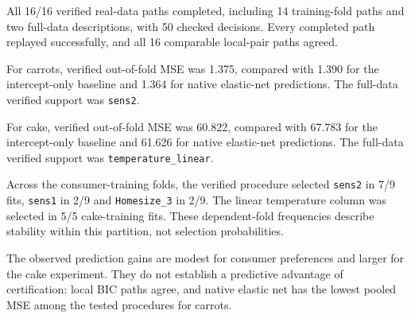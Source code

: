All 16/16 verified real-data paths completed, including 14 training-fold
paths and two full-data descriptions, with 50 checked decisions. Every completed
path replayed successfully, and all 16 comparable local-pair paths agreed.

For carrots, verified out-of-fold MSE was 1.375, compared with 1.390
for the intercept-only baseline and 1.364 for native elastic-net predictions.
The full-data verified support was \texttt{sens2}.

For cake, verified out-of-fold MSE was 60.822, compared with 67.783
for the intercept-only baseline and 61.626 for native elastic-net predictions.
The full-data verified support was \texttt{temperature\_linear}.

Across the consumer-training folds, the verified procedure selected \texttt{sens2}
in 7/9 fits, \texttt{sens1} in 2/9 and
\texttt{Homesize\_3} in 2/9. The linear temperature column
was selected in 5/5 cake-training fits. These dependent-fold
frequencies describe stability within this partition, not selection probabilities.

The observed prediction gains are modest for consumer preferences and larger
for the cake experiment. They do not establish a predictive advantage of
certification: local BIC paths agree, and native elastic net has the lowest
pooled MSE among the tested procedures for carrots.
